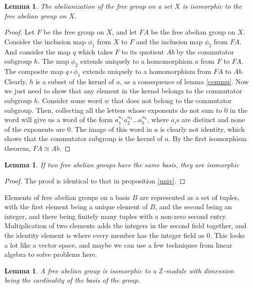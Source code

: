 \documentclass[12pt]{article}
\newtheorem{lem}[thm]{Lemma}
\theoremstyle{definition}
\begin{document}
\begin{lem}\label{stuck}
The abelianization of the free group on a set $X$ is isomorphic to the free abelian group on $X$.
\end{lem}

\begin{proof}
Let $F$ be the free group on $X$, and let $FA$ be the free abelian group on $X$. Consider the inclusion map $\phi_1$ from $X$ to $F$ and the inclusion map $\phi_2$ from $FA$. And consider the map $q$ which takes $F$ to its quotient $Ab$ by the commutator subgroup $h$. The map $\phi_2$ extends uniquely to a homomorphism $a$ from $F$ to $FA$. The composite map $q \circ \phi_1$ extends uniquely to a homomorphism from $FA$ to $Ab$. Clearly, $h$ is a subset of the kernel of $a$, as a consequence of lemma \autoref{commu}. Now we just need to show that any element in the kernel belongs to the commutator subgroup $h$. Consider some word $w$ that does not belong to the commutator subgroup. Then, collecting all the letters whose exponents do not sum to $0$ in the word will give us a word of the form $a_1^{n_1}a_2^{n_2}\ldots a_k^{n_k}$, where $a_i$s are distinct and none of the exponents are $0$. The image of this word in $a$ is clearly not identity, which shows that the commutator subgroup is the kernel of $a$. By the first isomorphism theorem, $FA \cong Ab$.
\end{proof}

\begin{lem}
If two free abelian groups have the same basis, they are isomorphic
\end{lem}

\begin{proof}
The proof is identical to that in proposition \autoref{univ}.
\end{proof}

Elements of free abelian groups on a basis $B$ are represented as a set of tuples, with the first element being a unique element of $B$, and the second being an integer, and there being finitely many tuples with a non-zero second entry. Multiplication of two elements adds the integers in the second field together, and the identity element is where every member has the integer field as $0$. This looks a lot like a vector space, and maybe we can use a few techniques from linear algebra to solve problems here.

\begin{lem}
A free abelian group is isomorphic to a $\mathbb{Z}$-module with dimension being the cardinality of the basis of the group.
\end{lem}
\end{document}
